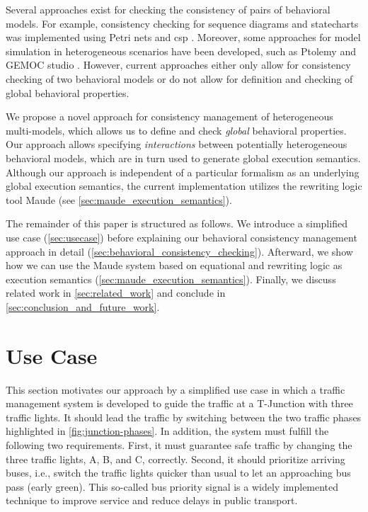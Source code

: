 \documentclass{jot}
\begin{document}
Several approaches exist for checking the consistency of pairs of behavioral models.
For example, consistency checking for sequence diagrams and statecharts was implemented using Petri nets \cite{yaoConsistencyCheckingUML2006} and \gls*{csp} \cite{kusterExplicitBehavioralConsistency2003}.
Moreover, some approaches for model simulation in heterogeneous scenarios have been developed, such as Ptolemy \cite{ekerTamingHeterogeneityPtolemy2003, leeDisciplinedHeterogeneousModeling2010} and GEMOC studio \cite{deantoniModelingBehavioralSemantics2016, varalarsenBCoolBehavioralCoordination2016}.
However, current approaches either only allow for consistency checking of two behavioral models or do not allow for definition and checking of global behavioral properties.

We propose a novel approach for consistency management of heterogeneous multi-models, which allows us to define and check \emph{global} behavioral properties.
Our approach allows specifying \emph{interactions} between potentially heterogeneous behavioral models, which are in turn used to generate global execution semantics.
Although our approach is independent of a particular formalism as an underlying global execution semantics, the current implementation utilizes the rewriting logic tool Maude (see \autoref{sec:maude_execution_semantics}).

The remainder of this paper is structured as follows.
We introduce a simplified use case (\autoref{sec:usecase}) before explaining our behavioral consistency management approach in detail (\autoref{sec:behavioral_consistency_checking}).
Afterward, we show how we can use the Maude system based on equational and rewriting logic as execution semantics (\autoref{sec:maude_execution_semantics}).
Finally, we discuss related work in \autoref{sec:related_work} and conclude in \autoref{sec:conclusion_and_future_work}.

\section{Use Case} \label{sec:usecase}
This section motivates our approach by a simplified use case in which a traffic management system is developed to guide the traffic at a T-Junction with three traffic lights.
It should lead the traffic by switching between the two traffic phases highlighted in \autoref{fig:junction-phases}.
In addition, the system must fulfill the following two requirements.
First, it must guarantee safe traffic by changing the three traffic lights, A, B, and C, correctly.
Second, it should prioritize arriving buses, i.e., switch the traffic lights quicker than usual to let an approaching bus pass (early green).
This so-called bus priority signal is a widely implemented technique to improve service and reduce delays in public transport.
\end{document}
